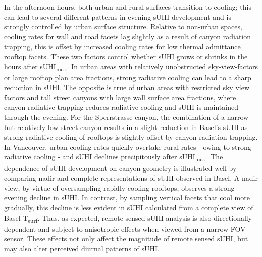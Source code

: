 \begin{bibunit}
In the afternoon hours, both urban and rural surfaces transition to cooling; this can lead to several different patterns in evening sUHI development and is strongly controlled by urban surface structure. Relative to non-urban spaces, cooling rates for wall and road facets lag slightly as a result of canyon radiation trapping, this is offset by increased cooling rates for low thermal admittance rooftop facets. These two factors control whether sUHI grows or shrinks in the hours after sUHI\textsubscript{max}. In urban areas with relatively unobstructed sky-view-factors or large rooftop plan area fractions, strong radiative cooling can lead to a sharp reduction in sUHI. The opposite is true of urban areas with restricted sky view factors and tall street canyons with large wall surface area fractions, where canyon radiative trapping reduces radiative cooling and sUHI is maintained through the evening. For the Sperrstrasse canyon, the combination of a narrow but relatively low street canyon results in a slight reduction in Basel's sUHI as strong radiative cooling of rooftops is slightly offset by canyon radiation trapping. In Vancouver, urban cooling rates quickly overtake rural rates - owing to strong radiative cooling - and sUHI declines precipitously after sUHI\textsubscript{max}. The dependence of sUHI development on canyon geometry is illustrated well by comparing nadir and complete representations of sUHI observed in Basel. A nadir view, by virtue of oversampling rapidly cooling rooftops, observes a strong evening decline in sUHI. In contrast, by sampling vertical facets that cool more gradually, this decline is less evident in sUHI calculated from a complete view of Basel T\textsubscript{surf}. Thus, as expected, remote sensed sUHI analysis is also directionally dependent and subject to anisotropic effects when viewed from a narrow-FOV sensor. These effects not only affect the magnitude of remote sensed sUHI, but may also alter perceived diurnal patterns of sUHI. 
 

\end{bibunit}
